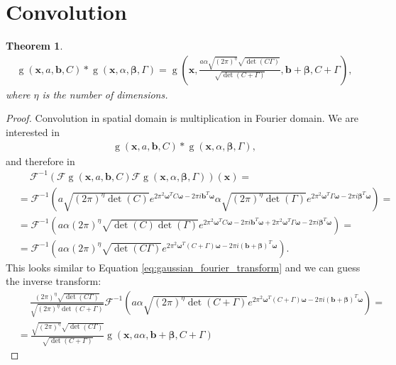 \documentclass{paper}
\newtheorem{theorem}{Theorem}
\newcommand{\F}{\ensuremath{\mathcal{F}}}
\newcommand{\vr}[1]{\ensuremath{\boldsymbol{#1}}}
\newcommand{\f}[1]{\operatorname{#1}}
\newcommand{\betavec}[0]{\ensuremath{\vr{\beta{}}}}
\newcommand{\omegavec}[0]{\ensuremath{\vr{\omega{}}}}
\newcommand{\bvec}[0]{\ensuremath{\vr{b}}}
\newcommand{\xvec}[0]{\ensuremath{\vr{x}}}
\begin{document}
\section{Convolution}
\begin{theorem}
	\begin{align}
		\f{g}(\xvec, a, \bvec, C) \ast \f{g}(\xvec, \alpha, \vr{\beta}, \Gamma) = 
		\f{g}\left(\xvec, \frac{a \alpha \sqrt{(2 \pi)^\eta} \sqrt{\f{det}(C\Gamma)}}{\sqrt{\f{det}(C+\Gamma)}}, \bvec + \betavec, C + \Gamma\right),
	\end{align}
	where $\eta$ is the number of dimensions.
\end{theorem}
\begin{proof}
Convolution in spatial domain is multiplication in Fourier domain.
We are interested in
\begin{align*}
	\f{g}(\xvec, a, \bvec, C) \ast \f{g}(\xvec, \alpha, \vr{\beta}, \Gamma),
\end{align*}
and therefore in
\begin{align*}
	&\ \quad \F^{-1}(\F\f{g}(\xvec, a, \bvec, C) \F\f{g}(\xvec, \alpha, \vr{\beta}, \Gamma))(\xvec) = \nonumber \\
	&= \F^{-1}\left(a \sqrt{(2 \pi)^\eta \f{det}(C)}      e^{2 \pi^2 \omegavec^T C \omegavec      - 2\pi i \bvec^T \omegavec}
	         \alpha \sqrt{(2 \pi)^\eta \f{det}(\Gamma)} e^{2 \pi^2 \omegavec^T \Gamma \omegavec - 2\pi i \betavec^T \omegavec}\right) = \nonumber \\
	&= \F^{-1}\left(a \alpha (2 \pi)^\eta \sqrt{\f{det}(C) \f{det}(\Gamma)}
			        e^{2 \pi^2 \omegavec^T C \omegavec - 2\pi i \bvec^T \omegavec + 2 \pi^2 \omegavec^T \Gamma \omegavec - 2\pi i \betavec^T \omegavec}\right) = \nonumber \\
	\label{eq:gaussian_convolution_before_inverse_transform}
	&= \F^{-1}\left(a \alpha (2 \pi)^\eta \sqrt{\f{det}(C\Gamma)}
                    e^{2 \pi^2 \omegavec^T (C + \Gamma) \omegavec - 2\pi i (\bvec + \betavec)^T \omegavec}\right).
\end{align*}
This looks similar to Equation \ref{eq:gaussian_fourier_transform} and we can guess the inverse transform:
\begin{align*}
	&\ \quad \frac{(2 \pi)^\eta \sqrt{\f{det}(C\Gamma)}}{\sqrt{(2\pi)^\eta \f{det}(C+\Gamma)}}
	        \F^{-1}\left(
	                     a \alpha \sqrt{(2\pi)^\eta \f{det}(C+\Gamma)}
	                     e^{2 \pi^2 \omegavec^T (C + \Gamma) \omegavec - 2\pi i (\bvec + \betavec)^T \omegavec}\right) = \\
	&= \frac{\sqrt{(2 \pi)^\eta} \sqrt{\f{det}(C\Gamma)}}{\sqrt{\f{det}(C+\Gamma)}}
	   \f{g}(\xvec, a \alpha, \bvec + \betavec, C + \Gamma)
\end{align*}
\end{proof}
\end{document}
